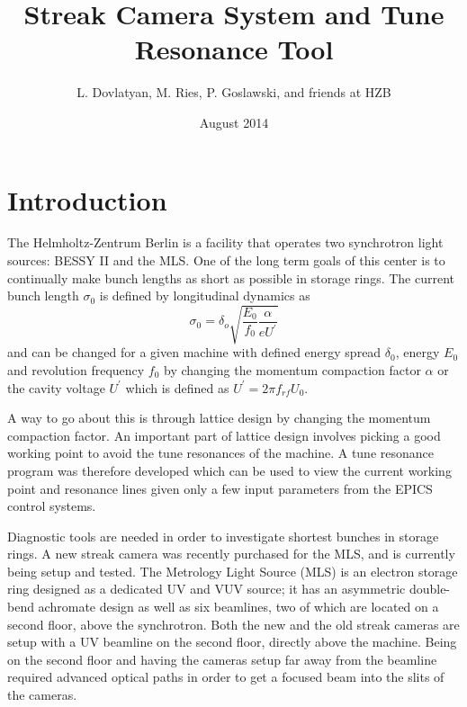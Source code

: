 \documentclass[%
 reprint,%
 amssymb, amsmath,%
 aip,cha,%
]{revtex4-1}
\begin{document}
\title{Streak Camera System and Tune Resonance Tool}%

\author{L. Dovlatyan, M. Ries, P. Goslawski, and friends at HZB}%
%

\date{August 2014}%

\maketitle

\tableofcontents

\section{Introduction}

The Helmholtz-Zentrum Berlin is a facility that operates two synchrotron light sources: BESSY II and the MLS. One of the long term goals of this center is to continually make bunch lengths as short as possible in storage rings. The current bunch length $\sigma_0$ is defined by longitudinal dynamics as
\begin{equation}
\sigma_0 = \delta_o \sqrt{\frac{E_0}{f_0} \frac{\alpha}{eU^\prime}}
\end{equation}
and can be changed for a given machine with defined energy spread $\delta_0$, energy $E_0$ and revolution frequency $f_0$ by changing the momentum compaction factor $\alpha$ or the cavity voltage $U^\prime$ which is defined as $U^\prime = 2\pi f_{rf} U_0$.

A way to go about this is through lattice design by changing the momentum compaction factor. An important part of lattice design involves picking a good working point to avoid the tune resonances of the machine. A tune resonance program was therefore developed which can be used to view the current working point and resonance lines given only a few input parameters from the EPICS control systems.

Diagnostic tools are needed in order to investigate shortest bunches in storage rings. A new streak camera was recently purchased for the MLS, and is currently being setup and tested. The Metrology Light Source (MLS) is an electron storage ring designed as a dedicated UV and VUV source; it has an asymmetric double-bend achromate design as well as six beamlines, two of which are located on a second floor, above the synchrotron. Both the new and the old streak cameras are setup with a UV beamline on the second floor, directly above the machine. Being on the second floor and having the cameras setup far away from the beamline required advanced optical paths in order to get a focused beam into the slits of the cameras.
\end{document}
